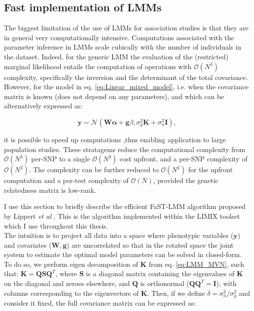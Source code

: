 \subsection{Fast implementation of LMMs}
\label{sec:fast_lmm}

The biggest limitation of the use of LMMs for association studies is that they are in general very computationally intensive.
Computations associated with the parameter inference in LMMs scale cubically with
the number of individuals in the dataset. 
Indeed, for the generic LMM
the evaluation of the (restricted) marginal likelihood entails the computation of operations with $\mathcal{O}(N^3)$ complexity, specifically the inversion and the determinant of the total covariance. 
However, for the model in eq. \eqref{eq:Linear_mixed_model}, i.e. when the covariance matrix is known (does not depend on any parameters), and which can be alternatively expressed as:

\begin{equation}\label{eq:LMM_MVN}
 \mathbf{y} \sim  \mathcal{N}(\mathbf{W}\boldsymbol{\alpha} + \mathbf{g}\beta, \sigma_g^2\mathbf{K} + \sigma_n^2\mathbf{I}),
\end{equation}

it is possible to speed up computations \cite{kang2008efficient, kang2010variance, lippert2011fast, zhou2012genome} ,thus enabling application to large population studies. 
These stratagems reduce the computational complexity from $\mathcal{O}(N^3)$
per-SNP to a single  $\mathcal{O}(N^3)$ cost upfront, and a per-SNP complexity of  $\mathcal{O}(N^2)$.
The complexity can be further reduced to $\mathcal{O}(N^2)$ for the upfront computation and a per-test complexity of  $\mathcal{O}(N)$, provided the genetic relatedness matrix is low-rank. 

\newpage

I use this section to  briefly describe the efficient FaST-LMM algorithm proposed by Lippert \textit{et al} \cite{lippert2011fast}.
This is the algorithm implemented within the LIMIX toolset \cite{lippert2014limix,casale2015efficient} which I use throughout this thesis.
\\

The intuition is to project all data into a space where phenotypic variables ($\mathbf{y}$) and covariates ($\mathbf{W}, \mathbf{g}$) are uncorrelated so that in the rotated space the joint system to estimate the optimal model parameters can be solved in closed-form.
To do so, we perform eigen decomposition of $\mathbf{K}$ from eq. \eqref{eq:LMM_MVN}, such that: $\mathbf{K} = \mathbf{Q}\mathbf{S}\mathbf{Q}^T$, where $\mathbf{S}$ is a diagonal matrix containing the eigenvalues of $\mathbf{K}$ on the diagonal and zeroes elsewhere, and $\mathbf{Q}$ is orthonormal ($\mathbf{Q}\mathbf{Q}^T = \mathbf{I}$), with columns corresponding to the eigenvectors of $\mathbf{K}$. 
Then, if we define $\delta = \sigma_n^2/\sigma_g^2$ and consider it fixed, the full covariance matrix can be expressed as:

